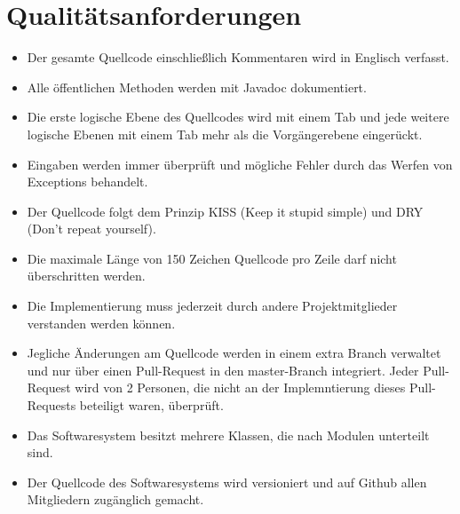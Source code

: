 \section{Qualitätsanforderungen}

\begin{itemize}
\item Der gesamte Quellcode einschließlich Kommentaren wird in Englisch verfasst.
\item Alle öffentlichen Methoden werden mit Javadoc dokumentiert.
\item Die erste logische Ebene des Quellcodes wird mit einem Tab und jede weitere logische Ebenen mit einem Tab mehr als die Vorgängerebene eingerückt.
\item Eingaben werden immer überprüft und mögliche Fehler durch das Werfen von Exceptions behandelt.
\item Der Quellcode folgt dem Prinzip KISS (Keep it stupid simple) und DRY (Don't repeat yourself).
\item Die maximale Länge von 150 Zeichen Quellcode pro Zeile darf nicht überschritten werden.
\item Die Implementierung muss jederzeit durch andere Projektmitglieder verstanden werden können.
\item Jegliche Änderungen am Quellcode werden in einem extra Branch verwaltet und nur über einen Pull-Request in den master-Branch integriert. Jeder Pull-Request wird von 2 Personen, die nicht an der Implemntierung dieses Pull-Requests beteiligt waren, überprüft. 
\item Das Softwaresystem besitzt mehrere Klassen, die nach Modulen unterteilt sind.
\item Der Quellcode des Softwaresystems wird versioniert und auf Github allen Mitgliedern zugänglich gemacht.
\end{itemize}